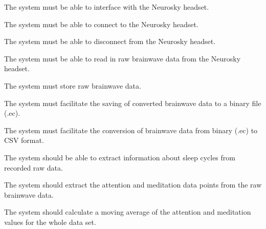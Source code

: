 \begin{reqtable}
  
  \reqheader

  {The system must be able to interface with the Neurosky headset.}
  \phigh
  \deps{\ref{sreq:connect-headset}, \ref{sreq:disconnect-headset}, \ref{sreq:read-data-headset}}

  {The system must be able to connect to the Neurosky headset.}
  \phigh
  \dnone

  {The system must be able to disconnect from the Neurosky headset.}
  \phigh
  \deps{\ref{sreq:connect-headset}}

  {The system must be able to read in raw brainwave data from the Neurosky headset.}
  \phigh
  \deps{\ref{sreq:connect-headset}}

  {The system must store raw brainwave data.}
  \phigh
  \deps{\ref{sreq:facilitate-saving}, \ref{sreq:facilitate-conversion}}

  {The system must facilitate the saving of converted brainwave data to a binary file (.ec).}
  \phigh
  \deps{\ref{sreq:read-data-headset}}

  {The system must facilitate the conversion of brainwave data from binary (.ec) to CSV format.}
  \phigh
  \deps{\ref{sreq:facilitate-saving}}

  {The system should be able to extract information about sleep cycles from recorded raw data.}
  \phigh
  \deps{\ref{sreq:extract-attention-meditation}, \ref{sreq:calculate-moving-average}}

  {The system should extract the attention and meditation data points from the raw brainwave data.}
  \phigh
  \deps{\ref{req:store-data}}

  {The system should calculate a moving average of the attention and meditation values for the whole
    data set.}
  \phigh
  \deps{\ref{sreq:extract-attention-meditation}}


\end{reqtable}
